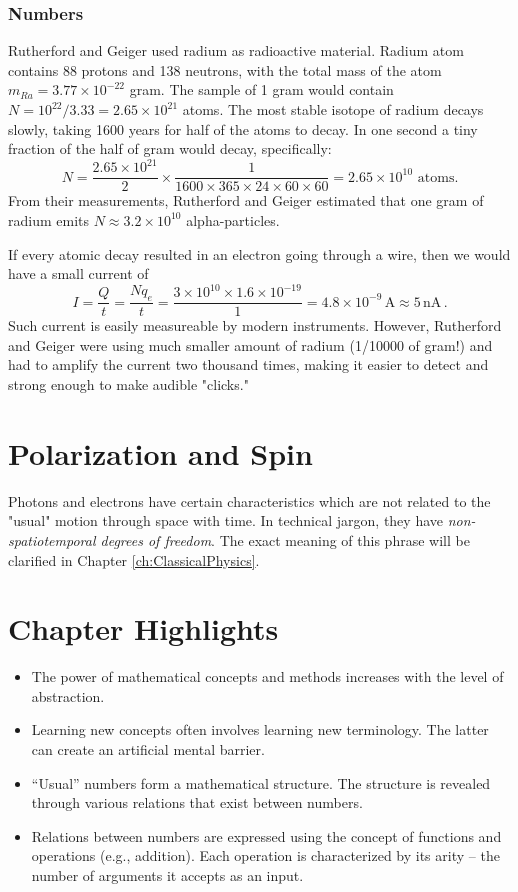 \subsubsection*{Numbers}
Rutherford and Geiger used radium as radioactive material. Radium atom contains 88 protons and 138 neutrons, with the total mass of the atom $m_{Ra}=3.77\times 10^{-22}$ gram. The sample of 1 gram would contain $N=10^{22}/3.33=2.65\times 10^{21}$ atoms. The most stable isotope of radium decays slowly, taking 1600 years for half of the atoms to decay. In one second a tiny fraction of  the half of gram would decay, specifically:
\[
N = \frac{2.65\times 10^{21}}{2}\times \frac{1}{1600\times 365\times 24\times 60 \times 60}=2.65\times 10^{10}\textrm{ atoms}.
\]
From their measurements, Rutherford and Geiger estimated that one gram of radium emits $N\approx 3.2\times 10^{10}$ alpha-particles.

If every atomic decay resulted in an electron going through a wire, then we would have a small current of 
\[
I = \frac{Q}{t} = \frac{N q_e}{t} = \frac{3\times 10^{10}\times 1.6\times 10^{-19}}{1}=4.8\times 10^{-9}\,\textrm{A}\approx 5\,\textrm{nA}\,.
\]
Such current is easily measureable by modern instruments. However, Rutherford and Geiger were using much smaller amount of radium (1/10000 of gram!) and had to amplify the current two thousand times, making it easier to detect and strong enough to make audible "clicks."



\section{Polarization and Spin}
Photons and electrons have certain characteristics which are not related to the "usual" motion through space with time. In technical jargon, they have \emph{non-spatiotemporal degrees of freedom}. The exact meaning of this phrase will be clarified in Chapter \ref{ch:ClassicalPhysics}.

\section*{Chapter Highlights}
{\chhc
  \it  
\begin{itemize}
\item The power of mathematical concepts and methods increases with
  the level of abstraction.
\item Learning new concepts often involves learning new
  terminology. The latter can create an artificial mental barrier.
\item ``Usual'' numbers form a mathematical structure. The structure
  is revealed through various relations that exist between numbers.
\item Relations between numbers are expressed using the concept of
  functions and operations (e.g., addition). Each operation is
  characterized by its arity -- the number of arguments it accepts as
  an input.
\end{itemize}


}
